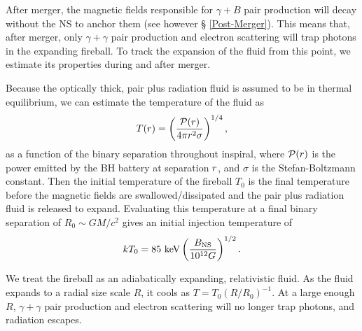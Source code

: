 After merger, the magnetic fields responsible for $\gamma + B$ pair
production will decay without the NS to anchor them (see however \S
\ref{Post-Merger}). This means that, after merger, only $\gamma +
\gamma$ pair production and electron scattering will trap photons in
the expanding fireball. To track the expansion of the fluid from this
point, we estimate its properties during and after merger.


Because the optically thick, pair plus radiation fluid is assumed to
be in thermal equilibrium, we can estimate the temperature of the
fluid as
\begin{align}
T(r) &=  \left( \frac{ \mathcal{P}(r) }{ 4 \pi r^2 \sigma } \right)^{1/4}, \nonumber \\
\end{align}
as a function of the binary separation throughout inspiral, where
$\mathcal{P}(r)$ is the power emitted by the BH battery at separation
$r$, and $\sigma$ is the Stefan-Boltzmann constant. Then the
initial temperature of the fireball $T_0$ is the final temperature
before the magnetic fields are swallowed/dissipated and the pair plus
radiation fluid is released to expand. Evaluating this temperature at
a final binary separation of $R_0 \sim GM/c^2$ gives an initial
injection temperature of
\begin{align}
kT_0= 85 \ \mbox{keV} \left( \frac{B_{\rm NS}}{10^{12} G} \right)^{1/2} .
\label{Eq:KTeff}
\end{align}

We treat the fireball as an adiabatically expanding, relativistic
fluid. As the fluid expands to a radial size scale $R$, it cools as $T
= T_0 (R/R_0)^{-1}$. At a large enough $R$, $\gamma + \gamma$ pair
production and electron scattering will no longer trap photons, and
radiation escapes.




